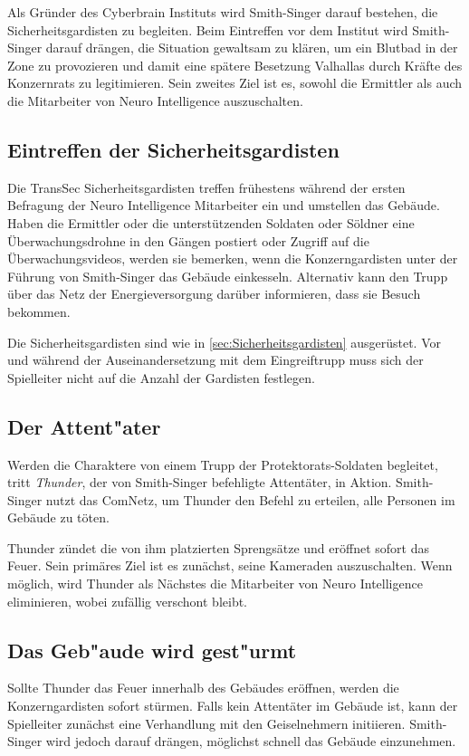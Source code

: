 Als Gründer des Cyberbrain Instituts wird Smith-Singer darauf bestehen, die Sicherheitsgardisten zu begleiten. Beim Eintreffen vor dem Institut wird Smith-Singer darauf drängen, die Situation gewaltsam zu klären, um ein Blutbad in der Zone zu provozieren und damit eine spätere Besetzung Valhallas durch Kräfte des Konzernrats zu legitimieren. Sein zweites Ziel ist es, sowohl die Ermittler als auch die Mitarbeiter von Neuro Intelligence auszuschalten.

\subsection{Eintreffen der Sicherheitsgardisten} 
Die TransSec Sicherheitsgardisten treffen frühestens während der ersten Befragung der Neuro Intelligence Mitarbeiter ein und umstellen das Gebäude. Haben die Ermittler oder die unterstützenden Soldaten oder Söldner eine Überwachungsdrohne in den Gängen postiert oder Zugriff auf die Überwachungsvideos, werden sie bemerken, wenn die Konzerngardisten unter der Führung von Smith-Singer das Gebäude einkesseln. Alternativ kann \xl{} den Trupp über das Netz der Energieversorgung darüber informieren, dass sie Besuch bekommen.

Die Sicherheitsgardisten sind wie in \cref{sec:Sicherheitsgardisten} ausgerüstet. Vor und während der Auseinandersetzung mit dem Eingreiftrupp muss sich der Spielleiter nicht auf die Anzahl der Gardisten festlegen.

\subsection{Der Attent"ater} 
Werden die Charaktere von einem Trupp der Protektorats-Soldaten begleitet, tritt \emph{Thunder}, der von Smith-Singer befehligte Attentäter, in Aktion. Smith-Singer nutzt das ComNetz, um Thunder den Befehl zu erteilen, alle Personen im Gebäude zu töten.

Thunder zündet die von ihm platzierten Sprengsätze und eröffnet sofort das Feuer. Sein primäres Ziel ist es zunächst, seine Kameraden auszuschalten. Wenn möglich, wird Thunder als Nächstes die Mitarbeiter von Neuro Intelligence eliminieren, wobei \ml{} zufällig verschont bleibt.

\subsection{Das Geb"aude wird gest"urmt} 
Sollte Thunder das Feuer innerhalb des Gebäudes eröffnen, werden die Konzerngardisten sofort stürmen. Falls kein Attentäter im Gebäude ist, kann der Spielleiter zunächst eine Verhandlung mit den Geiselnehmern initiieren. Smith-Singer wird jedoch darauf drängen, möglichst schnell das Gebäude einzunehmen.

